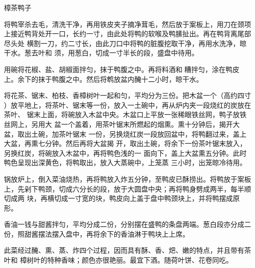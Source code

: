 \begin{recipe}{樟茶鸭子}

\ingredients


\preparation

\step 将鸭宰杀去毛，清洗干净，再用铁皮夹子摘净茸毛，然后放于案板上，用刀在颈项
上接近鸭背处开一口，长约一寸，由此处将鸭的软喉及鸭膆扯出。再在鸭背离尾部尽头处
横割一刀，约二寸长，由此刀口中将鸭的脏腹挖取干净，再用水洗净，晾干水。葱去叶和
须，用葱白，切成一寸半长的段，盛盘中待用。

\step 用碗将花椒、盐、胡椒面拌匀，抹于鸭腹之中。再将料酒和𰪿糟拌匀，涂在鸭皮
上。余下的抹于鸭腹之中。然后将鹎放盆内醃十二小时，晾干水。

\step 将花茶、锯末、柏枝、香樟树叶一起和匀，平均分为三份。把木盆一个（高约四寸
）放平地上，将茶叶、锯末等一份，放入一土碗中，再从炉内夹一段烧红的炭放在茶叶、
锯末上面，将碗放入木盆中央。木盆口上平放一张稀眼铁丝网，鸭子放铁丝网上，另用大
盆一个盖着，用茶叶锯末所燃起的烟熏。熏十分钟后，揭开大盆，取出土碗，加茶叶锯末
一份，另换烧红炭一段放回盆中，将鸭翻过来，盖上大盆，再熏七分钟。然后再将大盆揭
开，取出土碗，将余下一份茶叶锯末放入，另换红炭，将碗放入木盆中，再将鸭色浅的一
面向下，盖上大盆熏五分钟。此时鸭色呈现出深黄色，将鸭取出，放入大蒸碗中，上笼蒸
三小时，出笼晾冷待用。

\step 锅放炉上，倒入菜油烧热，再将鸭放入炸五分钟，至鸭皮已酥捞出。将鸭放于案板
上，先剁下鸭颈，切成六分长的段，放于大圆盘中央；再将鸭身劈成两半，每半顺切成两
块，再横切成一寸宽的块，鸭皮向上盖于盘中鸭颈块上，并将鸭摆成原形。

\step 香油一钱与甜酱拌匀，平均分成二份，分别摆在盛鸭的条盘两端。葱白段亦分成二
份，照甜酱摆法摆入盘中，再将余下的香油淋于鸭块上上席。

\features

此菜经过醃、熏、蒸、炸四个过程，因而具有酥、香、𤆵、嫩的特点，并且带有茶叶和
樟树叶的特种香味；颜色亦很艳丽。最宜下酒。随荷叶饼、花卷同吃。

\end{recipe}

